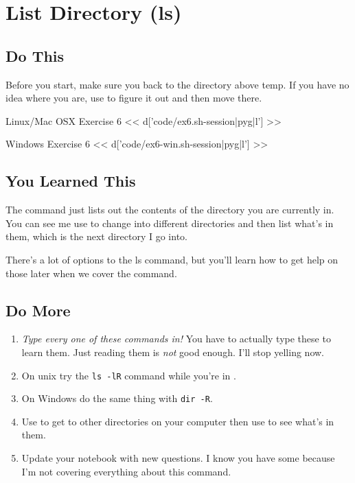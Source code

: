 \chapter{List Directory (ls)}

\section{Do This}

Before you start, make sure you  back to the directory above temp.
If you have no idea where you are, use  to figure it out and then
move there.

\begin{code}{Linux/Mac OSX Exercise 6}
<< d['code/ex6.sh-session|pyg|l'] >>
\end{code}

\begin{code}{Windows Exercise 6}
<< d['code/ex6-win.sh-session|pyg|l'] >>
\end{code}

\section{You Learned This}

The  command just lists out the contents of the directory you
are currently in.  You can see me use  to change into different
directories and then list what's in them, which is the next directory I
go into.

There's a lot of options to the ls command, but you'll learn how to get
help on those later when we cover the  command.

\section{Do More}

\begin{enumerate}
\item \emph{Type every one of these commands in!} You have to actually type these
    to learn them.  Just reading them is \emph{not} good enough.  I'll stop yelling
    now.
\item On unix try the \verb|ls -lR| command while you're in .
\item On Windows do the same thing with \verb|dir -R|.
\item Use  to get to other directories on your computer then use  to see what's in them.
\item Update your notebook with new questions.  I know you have some because I'm
    not covering everything about this command.
\end{enumerate}

